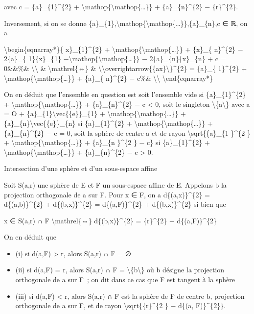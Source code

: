 \documentclass[]{article}
\begin{document}
avec c = \{a\}\_\{1\}\^{}\{2\} +
\textbackslash{}mathop\{\textbackslash{}mathop\{\ldots{}\}\} +
\{a\}\_\{n\}\^{}\{2\} − \{r\}\^{}\{2\}.

Inversement, si on se donne
\{a\}\_\{1\},\textbackslash{}mathop\{\textbackslash{}mathop\{\ldots{}\}\},\{a\}\_\{n\},c
∈ ℝ, on a

\textbackslash{}begin\{eqnarray*\}\{ x\}\_\{1\}\^{}\{2\} +
\textbackslash{}mathop\{\textbackslash{}mathop\{\ldots{}\}\} + \{x\}\_\{
n\}\^{}\{2\} − 2\{a\}\_\{ 1\}\{x\}\_\{1\}
−\textbackslash{}mathop\{\textbackslash{}mathop\{\ldots{}\}\} −
2\{a\}\_\{n\}\{x\}\_\{n\} + c = 0\&\&\%\&
\textbackslash{}\textbackslash{} \& \textbackslash{}mathrel\{⇔\} \&
\textbackslash{}\textbar{}\textbackslash{}overrightarrow\{\{ax\}\textbackslash{}\textbar{}\}\^{}\{2\}
= \{a\}\_\{ 1\}\^{}\{2\} +
\textbackslash{}mathop\{\textbackslash{}mathop\{\ldots{}\}\} + \{a\}\_\{
n\}\^{}\{2\} − c\%\& \textbackslash{}\textbackslash{}
\textbackslash{}end\{eqnarray*\}

On en déduit que l'ensemble en question est soit l'ensemble vide si
\{a\}\_\{1\}\^{}\{2\} +
\textbackslash{}mathop\{\textbackslash{}mathop\{\ldots{}\}\} +
\{a\}\_\{n\}\^{}\{2\} − c \textless{} 0, soit le singleton
\textbackslash{}\{a\textbackslash{}\} avec a = O +
\{a\}\_\{1\}\textbackslash{}vec\{\{e\}\}\_\{1\} +
\textbackslash{}mathop\{\textbackslash{}mathop\{\ldots{}\}\} +
\{a\}\_\{n\}\textbackslash{}vec\{\{e\}\}\_\{n\} si \{a\}\_\{1\}\^{}\{2\}
+ \textbackslash{}mathop\{\textbackslash{}mathop\{\ldots{}\}\} +
\{a\}\_\{n\}\^{}\{2\} − c = 0, soit la sphère de centre a et de rayon
\textbackslash{}sqrt\{\{a\}\_\{1 \}\^{}\{2 \} +
\textbackslash{}mathop\{\textbackslash{}mathop\{\ldots{}\}\} +
\{a\}\_\{n \}\^{}\{2 \} − c\} si \{a\}\_\{1\}\^{}\{2\} +
\textbackslash{}mathop\{\textbackslash{}mathop\{\ldots{}\}\} +
\{a\}\_\{n\}\^{}\{2\} − c \textgreater{} 0.

Intersection d'une sphère et d'un sous-espace affine

Soit S(a,r) une sphère de E et F un sous-espace affine de E. Appelons b
la projection orthogonale de a sur F. Pour x ∈ F, on a
d\{(a,x)\}\^{}\{2\} = d\{(a,b)\}\^{}\{2\} + d\{(b,x)\}\^{}\{2\} =
d\{(a,F)\}\^{}\{2\} + d\{(b,x)\}\^{}\{2\} si bien que

x ∈ S(a,r) ∩ F \textbackslash{}mathrel\{⇔\} d\{(b,x)\}\^{}\{2\} =
\{r\}\^{}\{2\} − d\{(a,F)\}\^{}\{2\}

On en déduit que

\begin{itemize}
\itemsep1pt\parskip0pt
\item
  (i) si d(a,F) \textgreater{} r, alors S(a,r) ∩ F = ∅
\item
  (ii) si d(a,F) = r, alors S(a,r) ∩ F =
  \textbackslash{}\{b\textbackslash{}\} où b désigne la projection
  orthogonale de a sur F~; on dit dans ce cas que F est tangent à la
  sphère
\item
  (iii) si d(a,F) \textless{} r, alors S(a,r) ∩ F est la sphère de F de
  centre b, projection orthogonale de a sur F, et de rayon
  \textbackslash{}sqrt\{\{r\}\^{}\{2 \} − d\{(a, F)\}\^{}\{2\}\}.
\end{itemize}
\end{document}
